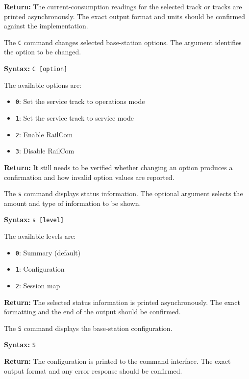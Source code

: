 \textbf{Return:} The current-consumption readings for the selected track
or tracks are printed asynchronously. The exact output format and units
should be confirmed against the implementation.


The \texttt{C} command changes selected base-station options. The argument
identifies the option to be changed.

\textbf{Syntax:} \texttt{C [option]}

The available options are:

\begin{itemize}
    \item \texttt{0}: Set the service track to operations mode
    \item \texttt{1}: Set the service track to service mode
    \item \texttt{2}: Enable RailCom
    \item \texttt{3}: Disable RailCom
\end{itemize}

\textbf{Return:} It still needs to be verified whether changing an option
produces a confirmation and how invalid option values are reported.


The \texttt{s} command displays status information. The optional argument
selects the amount and type of information to be shown.

\textbf{Syntax:} \texttt{s [level]}

The available levels are:

\begin{itemize}
    \item \texttt{0}: Summary (default)
    \item \texttt{1}: Configuration
    \item \texttt{2}: Session map
\end{itemize}

\textbf{Return:} The selected status information is printed asynchronously.
The exact formatting and the end of the output should be confirmed.


The \texttt{S} command displays the base-station configuration.

\textbf{Syntax:} \texttt{S}

\textbf{Return:} The configuration is printed to the command interface.
The exact output format and any error response should be confirmed.

